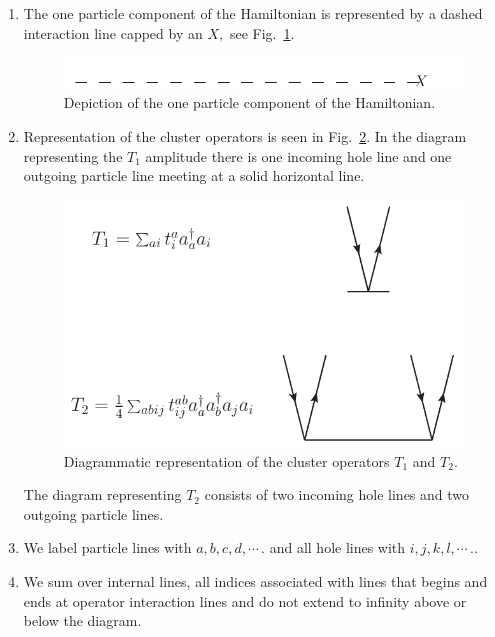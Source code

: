\begin{enumerate}
\item The one particle component of the Hamiltonian is represented
		by a dashed interaction line capped by an $X,$ see Fig.~\ref{hartreeX}.
\begin{figure}[htp]
\centering
\includegraphics[scale=0.75]{hartreefockop}
\caption{Depiction of the one particle component of the Hamiltonian.}
\label{hartreeX}
\end{figure}



\item Representation of the cluster operators is seen in 
Fig.~\ref{clusterdi}. In the diagram representing the $T_1$ amplitude there
is one incoming hole line and one outgoing particle line meeting at a solid
horizontal line.


\begin{figure}[htp]
\centering
\includegraphics[scale=0.5]{clusterdi}
\caption{Diagrammatic representation of the cluster operators $T_1$
and $T_2$.}
\label{clusterdi}
\end{figure}

The diagram representing $T_2$ consists of two incoming hole lines and two
outgoing particle lines. 

\item We label  particle lines with $a,b,c,d,\cdots\,.$ and all hole lines with $i,j,k,l,\cdots\,.$.

\item We sum over internal lines, all indices associated with lines that begins and ends at operator interaction lines and do not extend to infinity above or below the diagram.


\end{enumerate}
